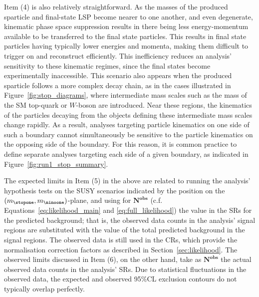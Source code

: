 Item (4) is also relatively straightforward.
As the masses of the produced sparticle and final-state LSP become nearer to one another, and even
degenerate, kinematic phase space suppression results in there being less energy-momentum available to be transferred to the final state
particles.
This results in final state particles having typically lower energies and momenta,
making them difficult to trigger on and reconstruct efficiently.
This inefficiency reduces an analysis' sensitivity to these kinematic regimes, since the final states become experimentally
inaccessible.
This scenario also appears when the produced sparticle follows a more complex decay chain,
as in the cases illustrated in Figure~\ref{fig:stop_diagrams}, where intermediate mass scales such as the
mass of the SM top-quark or $W$-boson are introduced.
Near these regions, the kinematics of the particles decaying from the objects defining these intermediate
mass scales change rapidly.
As a result, analyses targeting particle kinematics on one side of such a boundary
cannot simultaneously be sensitive to the particle kinematics on the opposing side of the boundary.
For this reason, it is common practice to define separate analyses targeting each side of a given boundary,
as indicated in Figure~\ref{fig:run1_stop_summary}.

The expected limits in Item (5) in the above are related to running the analysis' hypothesis tests
on the SUSY scenarios indicated by the position on the $(m_{\stopone}, m_{\ninoone})$-plane,
and using for $\bm{N^{\text{obs}}}$ (c.f. Equations~\ref{eq:likelihood_main} and \ref{eq:full_likelihood}) the value in the SRs for the predicted background; that is, the
observed data counts in the analysis' signal regions are substituted with the value of the total predicted
background in the signal regions.
The observed data is still used in the CRs, which provide the normalisation correction factors as described in Section~\ref{sec:likelihood}.
The observed limits discussed in Item (6), on the other hand, take as $\bm{N^{\text{obs}}}$ the actual observed data counts
in the analysis' SRs.
Due to statistical fluctuations in the observed data, the expected and observed 95\%CL exclusion contours
do not typically overlap perfectly.

